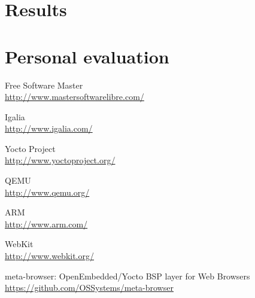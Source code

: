\documentclass[a4paper,11pt,openany]{report}
\begin{document}
\chapter{Results}


\chapter{Personal evaluation}

\begin{thebibliography}{ZZ}

Free Software Master\\
\url{http://www.mastersoftwarelibre.com/}

Igalia\\
\url{http://www.igalia.com/}

Yocto Project\\
\url{http://www.yoctoproject.org/}

QEMU\\
\url{http://www.qemu.org/}

ARM\\
\url{http://www.arm.com/}

WebKit\\
\url{http://www.webkit.org/}

meta-browser: OpenEmbedded/Yocto BSP layer for Web Browsers\\
\url{https://github.com/OSSystems/meta-browser}

\end{thebibliography}
\end{document}
